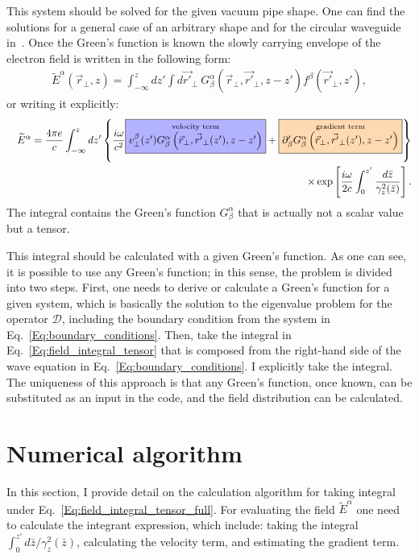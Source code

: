     This system should be solved for the given vacuum pipe shape. One can find the solutions for a general case of an arbitrary shape and for the circular waveguide in~. Once the Green's function is known the slowly carrying envelope of the electron field is written in the following form:
    \begin{align}
        \widetilde{E}^{\alpha}(\vec{r}_\bot,z) = \int_{-\infty}^{z} dz'
        \int d\vec{r'}_\bot~ G^\alpha_\beta\left(\vec{r}_\bot,
        \vec{r'}_\bot,z-z'\right) f^\beta\left(\vec{r'}_\bot,z'\right),
        \label{Eq:field_integral_tensor}
    \end{align}
    or writing it explicitly:
    \begin{align}
        &&\widetilde{E}^\alpha = \frac{4\pi e}{c} \int_{-\infty}^{z} dz'
        \left\{ \frac{i\omega}{c^2} \fcolorbox{black}{blue!30}{$\stackrel{\text{velocity term}}{v_\bot^\beta(z')
        G^\alpha_\beta\left(\vec{r}_\bot,\vec{r'}_\bot(z'), z-z'
        \right)}$}+\fcolorbox{black}{orange!30}{$\stackrel{\text{gradient term}}{\partial'_\beta
        G^\alpha_\beta\left(\vec{r}_\bot,\vec{r'}_\bot(z'), z-z'\right)}$}
        \right\}\cr &&\times \exp\left[\frac{i\omega}{2c} \int_0^{z'}
        \frac{d\bar{z}}{\gamma^2_z(\bar{z})} \right].
        \label{Eq:field_integral_tensor_full}
    \end{align}
    The integral contains the Green's function $G^\alpha_\beta$ that is actually not a scalar value but a tensor.

    This integral should be calculated with a given Green's function. As one can see, it is possible to use any Green's function; in this sense, the problem is divided into two steps. First, one needs to derive or calculate a Green's function for a given system, which is basically the solution to the eigenvalue problem for the operator $\mathcal{D}$, including the boundary condition from the system in Eq.~\ref{Eq:boundary_conditions}. Then, take the integral in Eq.~\ref{Eq:field_integral_tensor} that is composed from the right-hand side of the wave equation in Eq.~\ref{Eq:boundary_conditions}. I explicitly take the integral. The uniqueness of this approach is that any Green's function, once known, can be substituted as an input in the code, and the field distribution can be calculated.


\section{Numerical algorithm}
    In this section, I provide detail on the calculation algorithm for taking integral under Eq.~\ref{Eq:field_integral_tensor_full}. For evaluating the field $\widetilde{E}^\alpha$ one need to calculate the integrant expression, which include: taking the integral $\int_0^{z'}
    d\bar{z}/\gamma^2_z(\bar{z})$, calculating the velocity term, and estimating the gradient term. 
    
